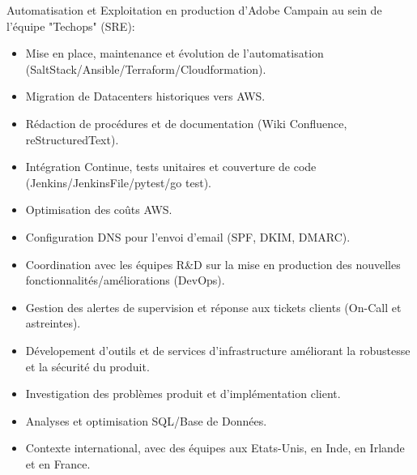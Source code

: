 \documentclass[10pt,a4paper,sans]{moderncv}        %
\begin{document}
        {}
        {}
        {}
        {Automatisation et Exploitation en production d'Adobe Campain au sein de l'équipe "Techops" (SRE):
            \begin{itemize}
            \item Mise en place, maintenance et évolution de l'automatisation (SaltStack/Ansible/Terraform/Cloudformation).
            \item Migration de Datacenters historiques vers AWS.
            \item Rédaction de procédures et de documentation (Wiki Confluence, reStructuredText).
            \item Intégration Continue, tests unitaires et couverture de code (Jenkins/JenkinsFile/pytest/go test).
            \item Optimisation des coûts AWS.
            \item Configuration DNS pour l'envoi d'email (SPF, DKIM, DMARC).
            \item Coordination avec les équipes R\&D sur la mise en production des nouvelles fonctionnalités/améliorations (DevOps).
            \item Gestion des alertes de supervision et réponse aux tickets clients (On-Call et astreintes).
            \item Dévelopement d'outils et de services d'infrastructure améliorant la robustesse et la sécurité du produit.
            \item Investigation des problèmes produit et d'implémentation client.
            \item Analyses et optimisation SQL/Base de Données.
            \item Contexte international, avec des équipes aux Etats-Unis, en Inde, en Irlande et en France.
            \end{itemize}
        }
\end{document}
